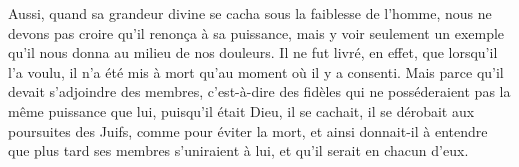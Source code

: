 Aussi, quand sa grandeur divine se cacha sous la faiblesse de l’homme,
	nous ne devons pas croire qu’il renonça à sa puissance, 
	mais y voir seulement un exemple qu’il nous donna au milieu de nos douleurs.
Il ne fut livré, en effet, que lorsqu’il l'a voulu,
	il n’a été mis à mort qu’au moment où il y a consenti.
Mais parce qu’il devait s’adjoindre des membres,
	c’est-à-dire des fidèles
		qui ne posséderaient pas la même puissance que lui, puisqu’il était Dieu,
	il se cachait, il se dérobait aux poursuites des Juifs, comme pour éviter la mort,
	et ainsi donnait-il à entendre que plus tard ses membres s’uniraient à lui,
	et qu’il serait en chacun d’eux.
